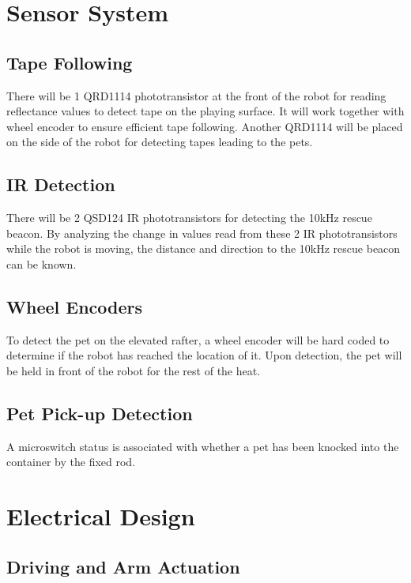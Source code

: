\documentclass[11pt, oneside]{article} %
\begin{document}

\section{Sensor System}
	
	\subsection{Tape Following}
	
	There will be 1 QRD1114 phototransistor at the front of the robot for reading reflectance values to detect tape on the playing surface. It will work together with wheel encoder to ensure efficient tape following. Another QRD1114 will be placed on the side of the robot for detecting tapes leading to the pets. 
	
	\subsection{IR Detection}
	There will be 2 QSD124 IR phototransistors for detecting the 10kHz rescue beacon. By analyzing the change in values read from these 2 IR phototransistors while the robot is moving, the distance and direction to the 10kHz rescue beacon can be known. 
	\subsection{Wheel Encoders}
	To detect the pet on the elevated rafter, a wheel encoder will be hard coded to determine if the robot has reached the location of it. Upon detection, the pet will be held in front of the robot for the rest of the heat. 
	\subsection{Pet Pick-up Detection}
	A microswitch status is associated with whether a pet has been knocked into the container by the fixed rod.

\section{Electrical Design}

	\subsection{Driving and Arm Actuation}
	
\end{document}
